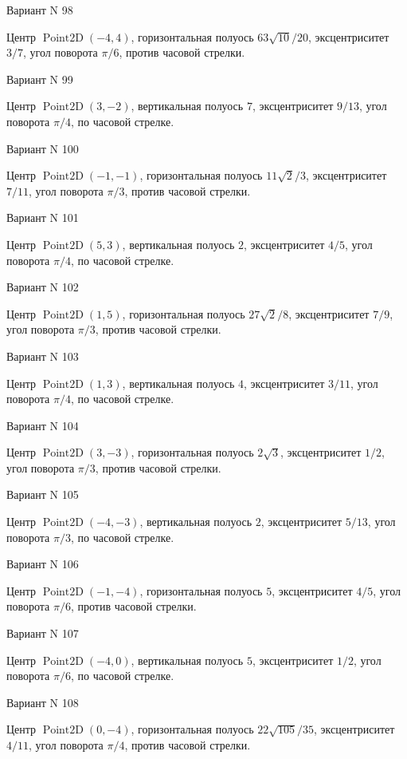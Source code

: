 \documentclass[11pt]{report}
\begin{document}
Вариант N 98

Центр $\operatorname{Point2D}\left(-4, 4\right)$, горизонтальная полуось $63 \sqrt{10} / 20$, эксцентриситет $3 / 7$, угол поворота $\pi / 6$, против часовой стрелки.

Вариант N 99

Центр $\operatorname{Point2D}\left(3, -2\right)$, вертикальная полуось $7$, эксцентриситет $9 / 13$, угол поворота $\pi / 4$, по часовой стрелке.

Вариант N 100

Центр $\operatorname{Point2D}\left(-1, -1\right)$, горизонтальная полуось $11 \sqrt{2} / 3$, эксцентриситет $7 / 11$, угол поворота $\pi / 3$, против часовой стрелки.

Вариант N 101

Центр $\operatorname{Point2D}\left(5, 3\right)$, вертикальная полуось $2$, эксцентриситет $4 / 5$, угол поворота $\pi / 4$, по часовой стрелке.

Вариант N 102

Центр $\operatorname{Point2D}\left(1, 5\right)$, горизонтальная полуось $27 \sqrt{2} / 8$, эксцентриситет $7 / 9$, угол поворота $\pi / 3$, против часовой стрелки.

Вариант N 103

Центр $\operatorname{Point2D}\left(1, 3\right)$, вертикальная полуось $4$, эксцентриситет $3 / 11$, угол поворота $\pi / 4$, по часовой стрелке.

Вариант N 104

Центр $\operatorname{Point2D}\left(3, -3\right)$, горизонтальная полуось $2 \sqrt{3}$, эксцентриситет $1 / 2$, угол поворота $\pi / 3$, против часовой стрелки.

Вариант N 105

Центр $\operatorname{Point2D}\left(-4, -3\right)$, вертикальная полуось $2$, эксцентриситет $5 / 13$, угол поворота $\pi / 3$, по часовой стрелке.

Вариант N 106

Центр $\operatorname{Point2D}\left(-1, -4\right)$, горизонтальная полуось $5$, эксцентриситет $4 / 5$, угол поворота $\pi / 6$, против часовой стрелки.

Вариант N 107

Центр $\operatorname{Point2D}\left(-4, 0\right)$, вертикальная полуось $5$, эксцентриситет $1 / 2$, угол поворота $\pi / 6$, по часовой стрелке.

Вариант N 108

Центр $\operatorname{Point2D}\left(0, -4\right)$, горизонтальная полуось $22 \sqrt{105} / 35$, эксцентриситет $4 / 11$, угол поворота $\pi / 4$, против часовой стрелки.
\end{document}
